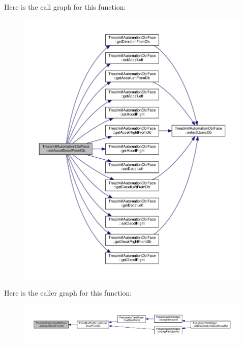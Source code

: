 Here is the call graph for this function\+:
\nopagebreak
\begin{figure}[H]
\begin{center}
\leavevmode
\includegraphics[width=350pt]{class_treadmill_automation_db_i_face_ab805c20ce5f736562c3769cdf7a7661b_cgraph}
\end{center}
\end{figure}
Here is the caller graph for this function\+:
\nopagebreak
\begin{figure}[H]
\begin{center}
\leavevmode
\includegraphics[width=350pt]{class_treadmill_automation_db_i_face_ab805c20ce5f736562c3769cdf7a7661b_icgraph}
\end{center}
\end{figure}
\mbox{\label{class_treadmill_automation_db_i_face_a14273054d1236eb6a2cd0db13037a4e9}} 
